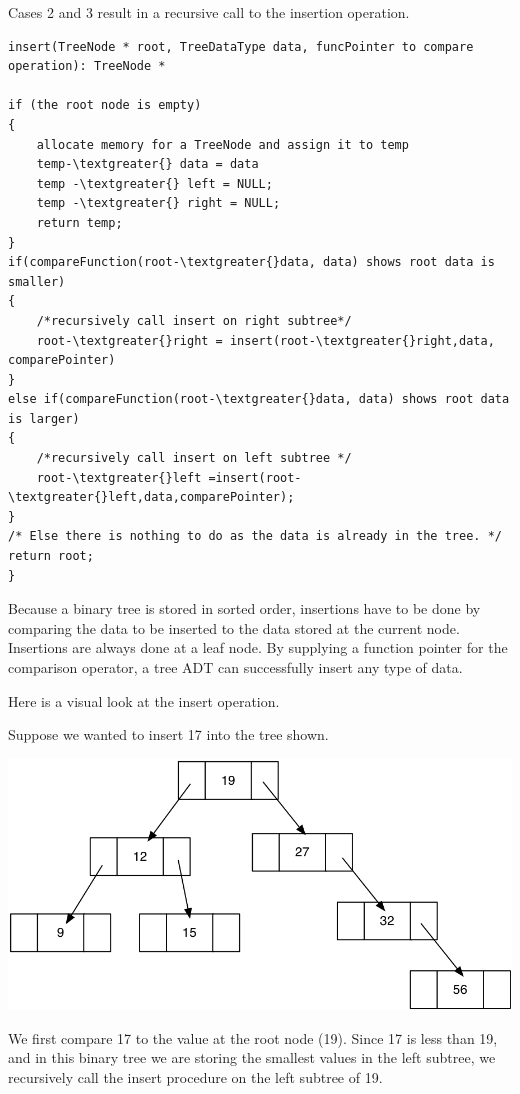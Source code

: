 Cases 2 and 3 result in a recursive call to the insertion operation.

\begin{lstlisting}
insert(TreeNode * root, TreeDataType data, funcPointer to compare operation): TreeNode *

if (the root node is empty)
{
	allocate memory for a TreeNode and assign it to temp
	temp-\textgreater{} data = data
	temp -\textgreater{} left = NULL;
	temp -\textgreater{} right = NULL;
	return temp;
}
if(compareFunction(root-\textgreater{}data, data) shows root data is smaller)
{
	/*recursively call insert on right subtree*/
	root-\textgreater{}right = insert(root-\textgreater{}right,data, comparePointer)
}
else if(compareFunction(root-\textgreater{}data, data) shows root data is larger)
{
	/*recursively call insert on left subtree */
	root-\textgreater{}left =insert(root-\textgreater{}left,data,comparePointer);
}
/* Else there is nothing to do as the data is already in the tree. */
return root;
}
\end{lstlisting}


Because a binary tree is stored in sorted order, insertions have to be
done by comparing the data to be inserted to the data stored at the
current node. Insertions are always done at a leaf node. By supplying a
function pointer for the comparison operator, a tree ADT can
successfully insert any type of data.

Here is a visual look at the insert operation.

Suppose we wanted to insert 17 into the tree shown.

\includegraphics[width=6.00000in]{pictures/bintree1.png}

We first compare 17 to the value at the root node (19). Since 17 is
less than 19, and in this binary tree we are storing the smallest values in the left subtree,  we recursively call the insert procedure on the left
subtree of 19.

